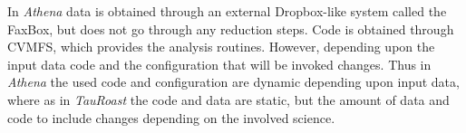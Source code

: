 In \emph{Athena} data is obtained through an external Dropbox-like system called the FaxBox, but does not go through any reduction steps. Code is obtained through 
CVMFS, which provides the analysis routines. However, depending upon the input data code and the configuration that will be invoked changes. 
Thus in \emph{Athena} the used code and configuration are dynamic depending upon input data, where as in \emph{TauRoast} the code and data are static, 
but the amount of data and code to include changes depending on the involved science. 


%
%
% 
